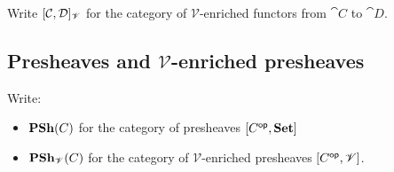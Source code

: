 \begin{definition}
Write $[\mathcal{C},\mathcal{D}]_{\mathscr{V}}$ for the category of $\mathscr{V}$-enriched functors from
$\cat{C}$ to $\cat{D}$.
\end{definition}

\subsection{Presheaves and $\mathscr{V}$-enriched presheaves}

Write:
\begin{itemize}
\item $\mathbf{PSh}(C)$ for the category of presheaves $[C^{\mathsf{op}},\mathbf{Set}]$
\item $\mathbf{PSh}_{\mathscr{V}}(C)$ for the category of $\mathscr{V}$-enriched presheaves
$[C^{\mathsf{op}},\mathscr{V}]$.
\end{itemize}
